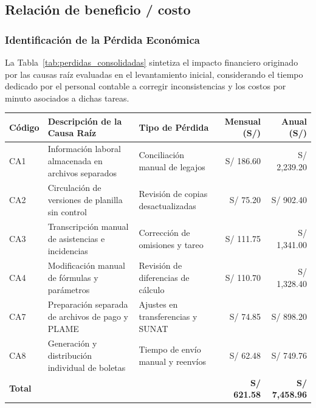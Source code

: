 \subsection{Relación de beneficio / costo}

\subsubsection{Identificación de la Pérdida Económica}

La Tabla~\ref{tab:perdidas_consolidadas} sintetiza el impacto financiero originado por las causas raíz evaluadas en el levantamiento inicial, 
considerando el tiempo dedicado por el personal contable a corregir inconsistencias y los costos por minuto asociados a dichas tareas.

\par
\noindent
\begin{minipage}{\linewidth}

    \begingroup
    \renewcommand{\baselinestretch}{1}
    \footnotesize
    \setlength{\tabcolsep}{4pt}
    \renewcommand{\arraystretch}{1.25}

    \begin{tabularx}{\linewidth}{@{}p{1.4cm}X p{3.4cm}r r@{}}
        \toprule
        \textbf{Código} & \textbf{Descripción de la Causa Raíz} & \textbf{Tipo de Pérdida} & \textbf{Mensual (S/)} & \textbf{Anual (S/)} \\ \midrule
        CA1 & Información laboral almacenada en archivos separados & Conciliación manual de legajos & S/ 186.60 & S/ 2,239.20 \\ \addlinespace
        CA2 & Circulación de versiones de planilla sin control & Revisión de copias desactualizadas & S/ 75.20 & S/ 902.40 \\ \addlinespace
        CA3 & Transcripción manual de asistencias e incidencias & Corrección de omisiones y tareo & S/ 111.75 & S/ 1,341.00 \\ \addlinespace
        CA4 & Modificación manual de fórmulas y parámetros & Revisión de diferencias de cálculo & S/ 110.70 & S/ 1,328.40 \\ \addlinespace
        CA7 & Preparación separada de archivos de pago y PLAME & Ajustes en transferencias y SUNAT & S/ 74.85 & S/ 898.20 \\ \addlinespace
        CA8 & Generación y distribución individual de boletas & Tiempo de envío manual y reenvíos & S/ 62.48 & S/ 749.76 \\ \midrule
        \textbf{Total} & & & \textbf{S/ 621.58} & \textbf{S/ 7,458.96} \\ \bottomrule
    \end{tabularx}
    \endgroup

\end{minipage}
\finBloqueAPA


